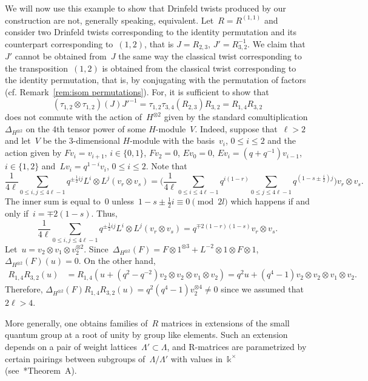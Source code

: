 \documentclass[12pt, reqno]{amsart}
\theoremstyle{definition}
\numberwithin{equation}{section}
\newcommand{\tensor}{\otimes}
\newcommand{\kk}{\mathbb{k}}\newcommand{\lie}[1]{{\mathfrak{#1}}}
\begin{document}
We will now use this example to show that Drinfeld twists produced by our construction
are not, generally speaking, equivalent. Let~$R=R^{(1,1)}$ and consider two Drinfeld twists corresponding to the identity permutation and its counterpart corresponding to~$(1,2)$, that is
$J=R_{2,3}$, $J'=R_{3,2}^{-1}$.
We claim that~$J'$ cannot be obtained from~$J$ the same way the classical
twist corresponding to the transposition~$(1,2)$ is obtained from the classical twist corresponding 
to the identity permutation, that is, by conjugating with the permutation of factors (cf. Remark~\ref{rem:isom permutations}).
For, it is sufficient to show that
$$
(\tau_{1,2}\tensor \tau_{1,2})(J)J'^{-1}=
\tau_{1,2}\tau_{3,4}(R_{2,3})R_{3,2}
=R_{1,4}R_{3,2}
$$
does not commute with the action of~$H^{\tensor 2}$
given by the standard comultiplication
$\Delta_{H^{\tensor 2}}$
on the 4th tensor power of some $H$-module~$V$.  
Indeed, suppose that~$\ell>2$ and let~$V$ be the 3-dimensional $H$-module with the 
basis~$v_i$, $0\le i\le 2$ and the action given by 
$F v_i=v_{i+1}$, $i\in\{0,1\}$, $Fv_2=0$, $Ev_0=0$, $Ev_i=(q+q^{-1})v_{i-1}$,
$i\in\{1,2\}$ and~$Lv_i=q^{1-i}v_i$, $0\le i\le 2$. Note that 
$$
\frac1{4\ell}\sum_{0\le i,j\le 4\ell-1} q^{\pm\frac12 ij} L^{i}\tensor L^{j}(v_r\tensor v_s)=\Big(\frac1{4\ell}\sum_{0\le i\le 4\ell-1} q^{i(1-r)}
\sum_{0\le j\le 4\ell-1} q^{(1-s\pm\frac i2)j}\Big) v_r\tensor v_s.
$$
The inner sum is equal to~$0$ unless~$1-s\pm\frac12 i\equiv 0\pmod{2l}$ which
happens if and only if~$i=\mp2(1-s)$. Thus,
$$
\frac1{4\ell}\sum_{0\le i,j\le 4\ell-1} q^{\pm\frac12 ij} L^{i}\tensor L^{j}(v_r\tensor v_s)=q^{\mp 2(1-r)(1-s)}v_r\tensor v_s.
$$
Let~$u=v_2\tensor v_1\tensor v_2^{\tensor2}$. Since~$\Delta_{H^{\tensor 2}}(F)=F\tensor 1^{\tensor 3}+L^{-2}\tensor 1\tensor F\tensor 1$,
$\Delta_{H^{\tensor 2}}(F)(u)=0$.
On the other hand,
\begin{align*}
R_{1,4}R_{3,2}(u)&=R_{1,4}(u+(q^2-q^{-2}) v_2\tensor v_2\tensor v_1\tensor v_2)=q^2 u+(q^4-1) v_2\tensor v_2\tensor v_1\tensor v_2.
\end{align*}
Therefore, $\Delta_{H^{\tensor 2}}(F)
R_{1,4}R_{3,2}(u)=q^2(q^4-1)v_2^{\tensor 4}\not=0$
since we assumed that~$2\ell>4$.


More generally, one obtains families of~$R$ matrices in
extensions of the small quantum group at a root of unity by group like
elements. Such an extension depends on a pair of weight lattices~$\Lambda'\subset\Lambda$, and 
R-matrices are parametrized by certain pairings between subgroups of~$\Lambda/\Lambda'$
with values in~$\kk^\times$
(see~\cite{LN}*{Theorem~A}).
\end{document}
